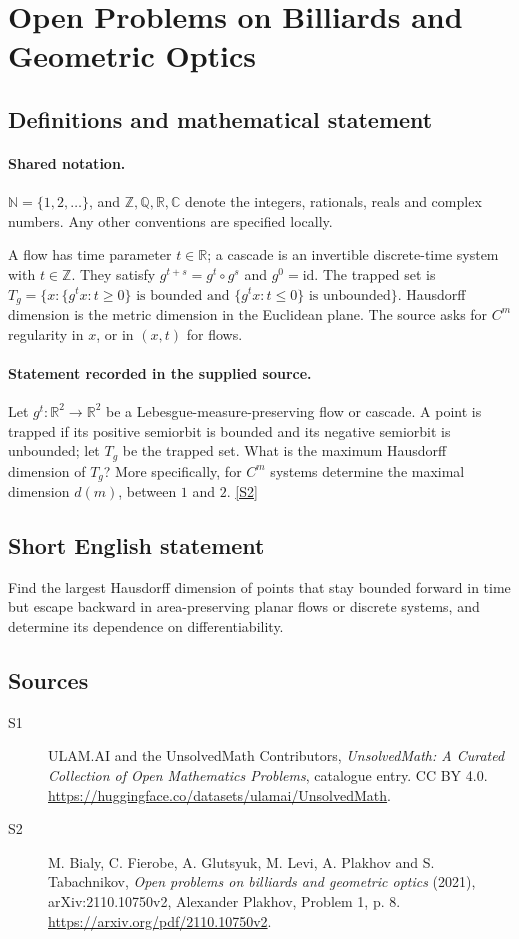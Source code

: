 \documentclass[11pt]{article}
\newcommand{\sref}[2]{\hyperlink{source:#1:#2}{[S#2]}}
\begin{document}
\section{Open Problems on Billiards and Geometric Optics}\label{statement}

\subsection{Definitions and mathematical statement}

\paragraph{Shared notation.}$\mathbb N=\{1,2,\ldots\}$, and $\mathbb Z,\mathbb Q,\mathbb R,\mathbb C$ denote the integers, rationals, reals and complex numbers. Any other conventions are specified locally.


A flow has time parameter $t\in\mathbb R$; a cascade is an invertible discrete-time system with $t\in\mathbb Z$. They satisfy $g^{t+s}=g^t\circ g^s$ and $g^0=\mathrm{id}$. The trapped set is $T_g=\{x:\{g^t x:t\ge0\}\text{ is bounded and }\{g^t x:t\le0\}\text{ is unbounded}\}$. Hausdorff dimension is the metric dimension in the Euclidean plane. The source asks for $C^m$ regularity in $x$, or in $(x,t)$ for flows.
\paragraph{Statement recorded in the supplied source.}
Let $g^t:\mathbb{R}^2\to\mathbb{R}^2$ be a Lebesgue-measure-preserving flow or cascade. A point is trapped if its positive semiorbit is bounded and its negative semiorbit is unbounded; let $T_g$ be the trapped set. What is the maximum Hausdorff dimension of $T_g$? More specifically, for $C^m$ systems determine the maximal dimension $d(m)$, between $1$ and $2$. \sref{statement}{2}
\subsection{Short English statement}
Find the largest Hausdorff dimension of points that stay bounded forward in time but escape backward in area-preserving planar flows or discrete systems, and determine its dependence on differentiability.
\subsection{Sources}
\begin{description}
\item[\hypertarget{source:statement:1}{S1}] ULAM.AI and the UnsolvedMath Contributors, \emph{UnsolvedMath: A Curated Collection of Open Mathematics Problems}, catalogue entry. CC BY 4.0. \url{https://huggingface.co/datasets/ulamai/UnsolvedMath}.
\item[\hypertarget{source:statement:2}{S2}] M. Bialy, C. Fierobe, A. Glutsyuk, M. Levi, A. Plakhov and S. Tabachnikov, \emph{Open problems on billiards and geometric optics} (2021), arXiv:2110.10750v2, Alexander Plakhov, Problem 1, p. 8. \url{https://arxiv.org/pdf/2110.10750v2}.
\end{description}
\label{end:statement}
\end{document}

